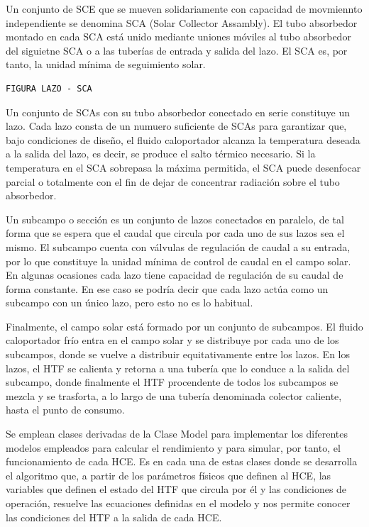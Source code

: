 Un conjunto de SCE que se mueven solidariamente con capacidad de movmiennto independiente se denomina SCA (Solar Collector Assambly). El tubo absorbedor montado en cada SCA está unido mediante uniones móviles al tubo absorbedor del siguietne SCA o a las tuberías de entrada y salida del lazo. El SCA es, por tanto, la unidad mínima de seguimiento solar.

\begin{verbatim}
FIGURA LAZO - SCA
\end{verbatim}

Un conjunto de SCAs con su tubo absorbedor conectado en serie constituye un lazo. Cada lazo consta de un numuero suficiente de SCAs para garantizar que, bajo condiciones de diseño, el fluido caloportador alcanza la temperatura deseada a la salida del lazo, es decir, se produce el salto térmico necesario. Si la temperatura en el SCA sobrepasa la máxima permitida, el SCA puede desenfocar parcial o totalmente con el fin de dejar de concentrar radiación sobre el tubo absorbedor.

Un subcampo o sección es un conjunto de lazos conectados en paralelo, de tal forma que se espera que el caudal que circula por cada uno de sus lazos sea el mismo. El subcampo cuenta con válvulas de regulación de caudal a su entrada, por lo que constituye la unidad mínima de control de caudal en el campo solar. En algunas ocasiones cada lazo tiene capacidad de regulación de su caudal de forma constante. En ese caso se podría decir que cada lazo actúa como un subcampo con un único lazo, pero esto no es lo habitual.

Finalmente, el campo solar está formado por un conjunto de subcampos. El fluido caloportador frío entra en el campo solar y se distribuye por cada uno de los subcampos, donde se vuelve a distribuir equitativamente entre los lazos. En los lazos, el HTF se calienta y retorna a una tubería que lo conduce a la salida del subcampo, donde finalmente el HTF procendente de todos los subcampos se mezcla y se trasforta, a lo largo de una tubería denominada colector caliente, hasta el punto de consumo.

Se emplean clases derivadas de la Clase Model para implementar los diferentes modelos empleados para calcular el rendimiento y para simular, por tanto, el funcionamiento de cada HCE. Es en cada una de estas clases donde se desarrolla el algoritmo que, a partir de los parámetros físicos que definen al HCE, las variables que definen el estado del HTF que circula por él y las condiciones de operación, resuelve las ecuaciones definidas en el modelo y nos permite conocer las
condiciones del HTF a la salida de cada HCE.

